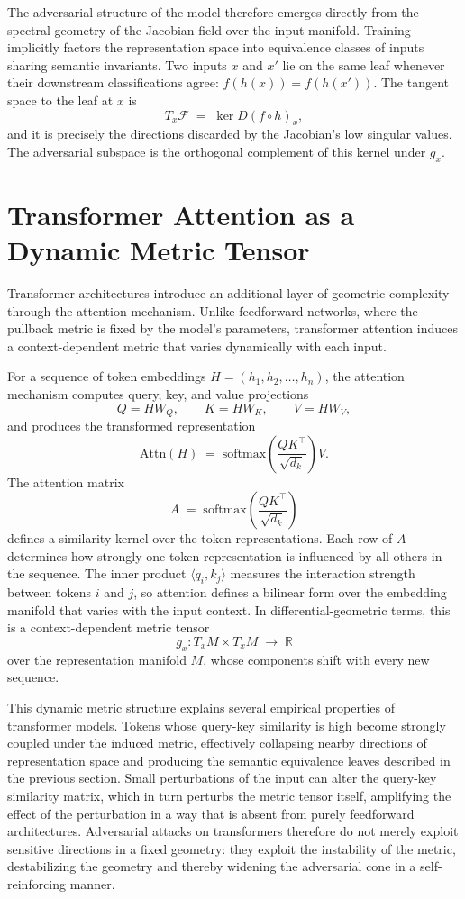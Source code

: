 \documentclass[12pt,a4paper]{article}
\theoremstyle{plain}
\theoremstyle{definition}
\begin{document}
The adversarial structure of the model therefore emerges directly from the
spectral geometry of the Jacobian field over the input manifold. Training
implicitly factors the representation space into equivalence classes of inputs
sharing semantic invariants. Two inputs $x$ and $x'$ lie on the same leaf
whenever their downstream classifications agree: $f(h(x)) = f(h(x'))$. The
tangent space to the leaf at $x$ is
\[
T_x \mathcal{F} \;=\; \ker D(f \circ h)_x,
\]
and it is precisely the directions discarded by the Jacobian's low singular
values. The adversarial subspace is the orthogonal complement of this kernel
under $g_x$.

\section{Transformer Attention as a Dynamic Metric Tensor}
\label{sec:attention}

Transformer architectures introduce an additional layer of geometric
complexity through the attention mechanism. Unlike feedforward networks,
where the pullback metric is fixed by the model's parameters, transformer
attention induces a context-dependent metric that varies dynamically with
each input.

For a sequence of token embeddings $H = (h_1, h_2, \dots, h_n)$, the
attention mechanism computes query, key, and value projections
\[
Q = H W_Q, \qquad K = H W_K, \qquad V = H W_V,
\]
and produces the transformed representation
\[
\mathrm{Attn}(H) \;=\;
\mathrm{softmax}\!\left(\frac{Q K^\top}{\sqrt{d_k}}\right) V.
\]
The attention matrix
\[
A \;=\; \mathrm{softmax}\!\left(\frac{Q K^\top}{\sqrt{d_k}}\right)
\]
defines a similarity kernel over the token representations. Each row of $A$
determines how strongly one token representation is influenced by all others in
the sequence. The inner product $\langle q_i, k_j \rangle$ measures the
interaction strength between tokens $i$ and $j$, so attention defines a
bilinear form over the embedding manifold that varies with the input context.
In differential-geometric terms, this is a context-dependent metric tensor
\[
g_x : T_x M \times T_x M \;\longrightarrow\; \mathbb{R}
\]
over the representation manifold $M$, whose components shift with every
new sequence.

This dynamic metric structure explains several empirical properties of
transformer models. Tokens whose query-key similarity is high become strongly
coupled under the induced metric, effectively collapsing nearby directions of
representation space and producing the semantic equivalence leaves described
in the previous section. Small perturbations of the input can alter the
query-key similarity matrix, which in turn perturbs the metric tensor itself,
amplifying the effect of the perturbation in a way that is absent from
purely feedforward architectures. Adversarial attacks on transformers
therefore do not merely exploit sensitive directions in a fixed geometry:
they exploit the instability of the metric, destabilizing the geometry and
thereby widening the adversarial cone in a self-reinforcing manner.
\end{document}
